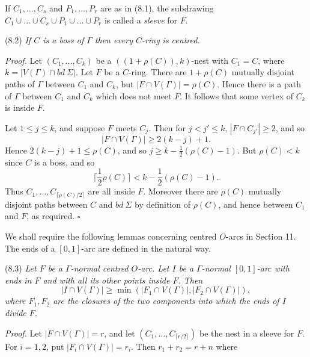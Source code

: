 If $C_1, \dots, C_s$ and $P_1, \dots, P_r$ are as in (8.1), the subdrawing $C_1 \cup \dots \cup C_s \cup P_1 \cup \dots \cup P_r$ is called a \textit{sleeve} for $F$.

\stmt
(8.2) \textit{If $C$ is a boss of $\Gamma$ then every $C$-ring is centred.}

\textit{Proof.} Let $(C_1, \dots, C_k)$ be a $((1 + \rho(C)), k)$-nest with $C_1 = C$, where $k = |V(\Gamma) \cap bd\ \Sigma|$. Let $F$ be a $C$-ring. There are $1 + \rho(C)$ mutually disjoint paths of $\Gamma$ between $C_1$ and $C_k$, but $|F \cap V(\Gamma)| = \rho(C)$. Hence there is a path of $\Gamma$ between $C_1$ and $C_k$ which does not meet $F$. It follows that some vertex of $C_k$ is inside $F$.

Let $1 \le j \le k$, and suppose $F$ meets $C_j$. Then for $j < j' \le k$, $|F \cap C_{j'}| \ge 2$, and so
\begin{equation*}
|F \cap V(\Gamma)| \ge 2(k - j) + 1.
\end{equation*}
Hence $2(k - j) + 1 \le \rho(C)$, and so $j \ge k - \frac{1}{2}(\rho(C) - 1)$. But $\rho(C) < k$ since $C$ is a boss, and so
\begin{equation*}
\lceil \frac{1}{2}\rho(C)\rceil < k - \frac{1}{2}(\rho(C) - 1).
\end{equation*}
Thus $C_1, \dots, C_{\lceil \rho(C)/2 \rceil}$ are all inside $F$. Moreover there are $\rho(C)$ mutually disjoint paths between $C$ and $bd\ \Sigma$ by definition of $\rho(C)$, and hence between $C_1$ and $F$, as required. $\square$

We shall require the following lemmas concerning centred $O$-arcs in Section 11. The ends of a $[0, 1]$-arc are defined in the natural way.

\stmt
(8.3) \textit{Let $F$ be a $\Gamma$-normal centred $O$-arc. Let $I$ be a $\Gamma$-normal $[0, 1]$-arc with ends in $F$ and with all its other points inside $F$. Then}
\begin{equation*}
|I \cap V(\Gamma)| \ge \min(|F_1 \cap V(\Gamma)|, |F_2 \cap V(\Gamma)|),
\end{equation*}
\textit{where $F_1, F_2$ are the closures of the two components into which the ends of $I$ divide $F$.}

\textit{Proof.} Let $|F \cap V(\Gamma)| = r$, and let $(C_1, \dots, C_{\lceil r/2 \rceil})$ be the nest in a sleeve for $F$. For $i = 1, 2$, put $|F_i \cap V(\Gamma)| = r_i$. Then $r_1 + r_2 = r + n$ where
